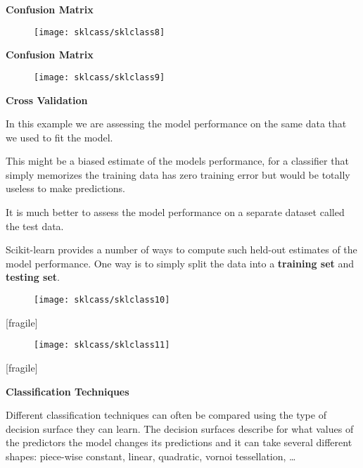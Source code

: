 \documentclass[MASTER.tex]{subfiles}
\begin{document}
 

 
\textbf{Confusion Matrix}\begin{figure}
\centering
\texttt{[image: sklcass/sklclass8]}

\end{figure}
 
 
\textbf{Confusion Matrix}
\begin{figure}
\centering
\texttt{[image: sklcass/sklclass9]}

\end{figure}


 
 
  
 \textbf{Cross Validation}
 
\item In this example we are assessing the model performance on the same data that we used to fit the model. 
\item This might be a biased estimate of the models performance, for a classifier that simply memorizes the training data has zero training error but would be totally useless to make predictions.
\item  It is much better to assess the model performance on a separate dataset called the test data.
\item  Scikit-learn provides a number of ways to compute such held-out estimates of the model performance.  One way is to simply split the data into a \textbf{training set} and \textbf{testing set}.
 

 
 
\begin{figure}
\centering
\texttt{[image: sklcass/sklclass10]}

\end{figure}

 
 [fragile]
\begin{figure}
\centering
\texttt{[image: sklcass/sklclass11]}

\end{figure}

 
 [fragile]
 
\textbf{Classification Techniques}
 
\item Different classification techniques can often be compared using the type of decision surface they can learn.  The decision surfaces describe for what values of the predictors the model changes its predictions and it can take several different shapes: piece-wise constant, linear, quadratic, vornoi tessellation, \ldots
 
\end{document}
